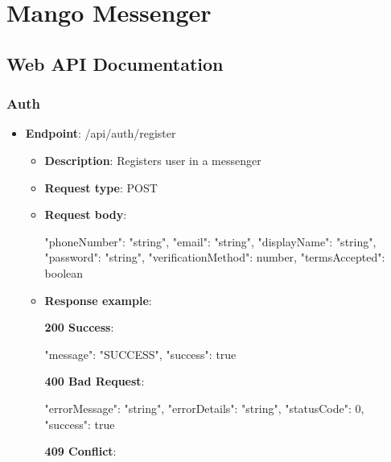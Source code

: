 \chapter{Mango Messenger}\label{ch:mango-messenger}


\section{Web API Documentation}\label{sec:web-api-documentation}

\subsection{Auth}\label{subsec:auth}
\begin{itemize}
    \item \textbf{Endpoint}: /api/auth/register
    \begin{itemize}
        \item \textbf{Description}: Registers user in a messenger
        \item \textbf{Request type}: POST
        \item \textbf{Request body}:
        \begin{spverbatim}
        {
            "phoneNumber": "string",
            "email": "string",
            "displayName": "string",
            "password": "string",
            "verificationMethod": number,
            "termsAccepted": boolean
        }
        \end{spverbatim}
        \item  \textbf{Response example}:

        \textbf{200 Success}:

        \begin{spverbatim}
        {
            "message": "SUCCESS",
            "success": true
        }
        \end{spverbatim}

        \textbf{400 Bad Request}:

        \begin{spverbatim}
        {
            "errorMessage": "string",
            "errorDetails": "string",
            "statusCode": 0,
            "success": true
        }
        \end{spverbatim}

        \textbf{409 Conflict}:


\end{itemize}
\end{itemize}
